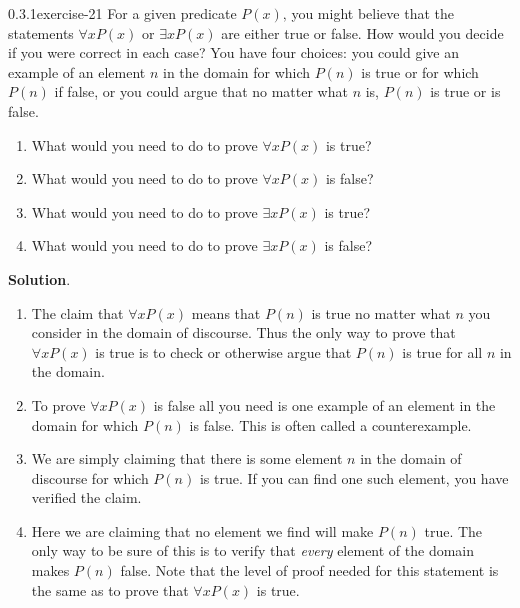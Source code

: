 \documentclass[twoside,11pt,]{book}
\numberwithin{equation}{chapter}
\begin{document}
\begin{divisionsolution}{0.3.1}{}{exercise-21}%
\hypertarget{p-528}{}%
For a given predicate \(P(x)\text{,}\) you might believe that the statements \(\forall x P(x)\) or \(\exists x P(x)\) are either true or false. How would you decide if you were correct in each case?  You have four choices: you could give an example of an element \(n\) in the domain for which \(P(n)\) is true or for which \(P(n)\) if false, or you could argue that no matter what \(n\) is, \(P(n)\) is true or is false.\leavevmode%
\begin{enumerate}[label=(\alph*)]
\item\hypertarget{li-532}{}\hypertarget{p-529}{}%
What would you need to do to prove \(\forall x P(x)\) is true?%
\item\hypertarget{li-533}{}\hypertarget{p-530}{}%
What would you need to do to prove \(\forall x P(x)\) is false?%
\item\hypertarget{li-534}{}\hypertarget{p-531}{}%
What would you need to do to prove \(\exists x P(x)\) is true?%
\item\hypertarget{li-535}{}\hypertarget{p-532}{}%
What would you need to do to prove \(\exists x P(x)\) is false?%
\end{enumerate}
%
\par\smallskip%
\noindent\textbf{Solution}.\quad%
\hypertarget{p-533}{}%
\leavevmode%
\begin{enumerate}[label=(\alph*)]
\item\hypertarget{li-536}{}\hypertarget{p-534}{}%
The claim that \(\forall x P(x)\) means that \(P(n)\) is true no matter what \(n\) you consider in the domain of discourse. Thus the only way to prove that \(\forall x P(x)\) is true is to check or otherwise argue that \(P(n)\) is true for all \(n\) in the domain.%
\item\hypertarget{li-537}{}\hypertarget{p-535}{}%
To prove \(\forall x P(x)\) is false all you need is one example of an element in the domain for which \(P(n)\) is false. This is often called a counterexample.%
\item\hypertarget{li-538}{}\hypertarget{p-536}{}%
We are simply claiming that there is some element \(n\) in the domain of discourse for which \(P(n)\) is true. If you can find one such element, you have verified the claim.%
\item\hypertarget{li-539}{}\hypertarget{p-537}{}%
Here we are claiming that no element we find will make \(P(n)\) true. The only way to be sure of this is to verify that \emph{every} element of the domain makes \(P(n)\) false. Note that the level of proof needed for this statement is the same as to prove that \(\forall x P(x)\) is true.%
\end{enumerate}
%
\end{divisionsolution}%
\end{document}
